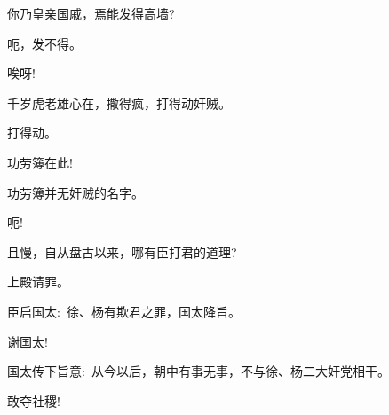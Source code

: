 {

你乃皇亲国戚，焉能发得高墙?

呃，发不得。


唉呀!


千岁虎老雄心在，撒得疯，打得动奸贼。

打得动。

功劳簿在此!

功劳簿并无奸贼的名字。

呃!

且慢，自从盘古以来，哪有臣打君的道理?

上殿请罪。

臣启国太:~徐、杨有欺君之罪，国太降旨。

谢国太!

国太传下旨意:~从今以后，朝中有事无事，不与徐、杨二大奸党相干。

敢夺社稷!

}
